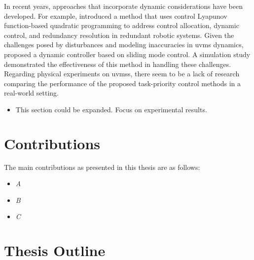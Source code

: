 In recent years, approaches that incorporate dynamic considerations have been 
developed. For example, \cite{basso2020} introduced a method that uses control 
Lyapunov function-based quadratic programming to address control allocation, 
dynamic control, and redundancy resolution in redundant robotic systems. Given 
the challenges posed by disturbances and modeling inaccuracies in \gls{uvms} 
dynamics, \cite{iversflaten2022} proposed a dynamic controller based on sliding 
mode control. A simulation study demonstrated the effectiveness of this method 
in handling these challenges. Regarding physical experiments on \gls{uvms}s, there 
seem to be a lack of research comparing the performance of the proposed 
task-priority control methods in a real-world setting.

{
\color{red}
\begin{itemize}
    \item This section could be expanded. Focus on experimental results.
\end{itemize}
}

\section{Contributions}

The main contributions as presented in this thesis are as follows:
\begin{itemize}
    \item \emph{A}
    \item \emph{B}
    \item \emph{C}
\end{itemize}

\section{Thesis Outline}

